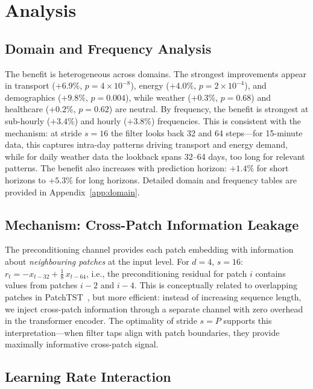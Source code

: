\documentclass{article}
\begin{document}
\section{Analysis}
\label{sec:analysis}

\subsection{Domain and Frequency Analysis}

The benefit is heterogeneous across domains. The strongest improvements appear in transport ($+6.9\%$, $p = 4 \times 10^{-8}$), energy ($+4.0\%$, $p = 2 \times 10^{-4}$), and demographics ($+9.8\%$, $p = 0.004$), while weather ($+0.3\%$, $p = 0.68$) and healthcare ($+0.2\%$, $p = 0.62$) are neutral. By frequency, the benefit is strongest at sub-hourly ($+3.4\%$) and hourly ($+3.8\%$) frequencies. This is consistent with the mechanism: at stride $s{=}16$ the filter looks back 32 and 64 steps---for 15-minute data, this captures intra-day patterns driving transport and energy demand, while for daily weather data the lookback spans 32--64 days, too long for relevant patterns. The benefit also increases with prediction horizon: $+1.4\%$ for short horizons to $+5.3\%$ for long horizons. Detailed domain and frequency tables are provided in Appendix~\ref{app:domain}.

\subsection{Mechanism: Cross-Patch Information Leakage}

The preconditioning channel provides each patch embedding with information about \emph{neighbouring patches} at the input level. For $d{=}4$, $s{=}16$: $r_t = -x_{t-32} + \tfrac{1}{8}\, x_{t-64}$, i.e., the preconditioning residual for patch $i$ contains values from patches $i{-}2$ and $i{-}4$. This is conceptually related to overlapping patches in PatchTST~\citep{nie2023patchtst}, but more efficient: instead of increasing sequence length, we inject cross-patch information through a separate channel with zero overhead in the transformer encoder. The optimality of stride $s = P$ supports this interpretation---when filter taps align with patch boundaries, they provide maximally informative cross-patch signal.

\subsection{Learning Rate Interaction}
\end{document}
